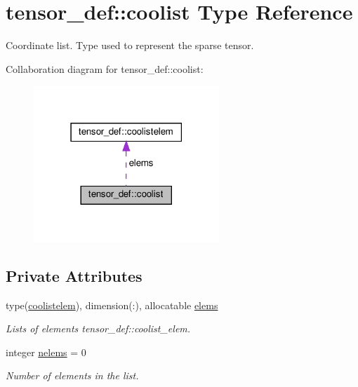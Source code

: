\hypertarget{structtensor__def_1_1coolist}{}\section{tensor\+\_\+def\+:\+:coolist Type Reference}
\label{structtensor__def_1_1coolist}


Coordinate list. Type used to represent the sparse tensor.  




Collaboration diagram for tensor\+\_\+def\+:\+:coolist\+:\nopagebreak
\begin{figure}[H]
\begin{center}
\leavevmode
\includegraphics[width=198pt]{structtensor__def_1_1coolist__coll__graph}
\end{center}
\end{figure}
\subsection*{Private Attributes}
\begin{DoxyCompactItemize}
\item 
\mbox{\label{structtensor__def_1_1coolist_a41e00da023c2c01ce5010940170c24b6}} 
type(\hyperlink{structtensor__def_1_1coolistelem}{coolistelem}), dimension(\+:), allocatable \hyperlink{structtensor__def_1_1coolist_a41e00da023c2c01ce5010940170c24b6}{elems}
\begin{DoxyCompactList}\small\item\em Lists of elements tensor\+\_\+def\+::coolist\+\_\+elem. \end{DoxyCompactList}\item 
\mbox{\label{structtensor__def_1_1coolist_acbdf5af7f599640405c1d194c87c07fd}} 
integer \hyperlink{structtensor__def_1_1coolist_acbdf5af7f599640405c1d194c87c07fd}{nelems} = 0
\begin{DoxyCompactList}\small\item\em Number of elements in the list. \end{DoxyCompactList}\end{DoxyCompactItemize}


